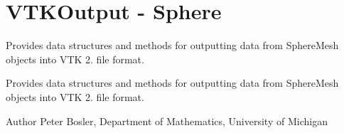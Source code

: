 \hypertarget{group___v_t_k_output}{\section{V\+T\+K\+Output -\/ Sphere}
\label{group___v_t_k_output}
}


Provides data structures and methods for outputting data from Sphere\+Mesh objects into V\+T\+K 2. file format.  


Provides data structures and methods for outputting data from Sphere\+Mesh objects into V\+T\+K 2. file format. 

\begin{DoxyAuthor}{Author}
Peter Bosler, Department of Mathematics, University of Michigan 
\end{DoxyAuthor}
